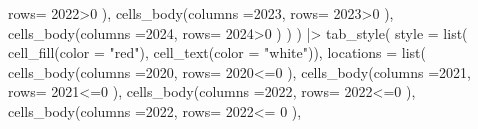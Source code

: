 \documentclass[
  letterpaper,
  DIV=11,
  numbers=noendperiod]{scrreprt}
\newenvironment{Shaded}{\begin{snugshade}}{\end{snugshade}}
\newcommand{\AttributeTok}[1]{\textcolor[rgb]{0.40,0.45,0.13}{#1}}
\newcommand{\DecValTok}[1]{\textcolor[rgb]{0.68,0.00,0.00}{#1}}
\newcommand{\FunctionTok}[1]{\textcolor[rgb]{0.28,0.35,0.67}{#1}}
\newcommand{\NormalTok}[1]{\textcolor[rgb]{0.00,0.23,0.31}{#1}}
\newcommand{\SpecialCharTok}[1]{\textcolor[rgb]{0.37,0.37,0.37}{#1}}
\newcommand{\StringTok}[1]{\textcolor[rgb]{0.13,0.47,0.30}{#1}}
\theoremstyle{definition}
\theoremstyle{remark}
\begin{document}
\begin{Shaded}
\begin{Highlighting}[]
                 \AttributeTok{rows=} \StringTok{\textasciigrave{}}\AttributeTok{2022}\StringTok{\textasciigrave{}}\SpecialCharTok{\textgreater{}}\DecValTok{0}\NormalTok{ ), }
       \FunctionTok{cells\_body}\NormalTok{(}\AttributeTok{columns =}\StringTok{\textasciigrave{}}\AttributeTok{2023}\StringTok{\textasciigrave{}}\NormalTok{, }
                 \AttributeTok{rows=} \StringTok{\textasciigrave{}}\AttributeTok{2023}\StringTok{\textasciigrave{}}\SpecialCharTok{\textgreater{}}\DecValTok{0}\NormalTok{ ), }
      \FunctionTok{cells\_body}\NormalTok{(}\AttributeTok{columns =}\StringTok{\textasciigrave{}}\AttributeTok{2024}\StringTok{\textasciigrave{}}\NormalTok{, }
                 \AttributeTok{rows=} \StringTok{\textasciigrave{}}\AttributeTok{2024}\StringTok{\textasciigrave{}}\SpecialCharTok{\textgreater{}}\DecValTok{0}\NormalTok{ )}
\NormalTok{    )}
\NormalTok{  ) }\SpecialCharTok{|\textgreater{}} 
  \FunctionTok{tab\_style}\NormalTok{(}
    \AttributeTok{style =} \FunctionTok{list}\NormalTok{(}
      \FunctionTok{cell\_fill}\NormalTok{(}\AttributeTok{color =} \StringTok{"red"}\NormalTok{), }
      \FunctionTok{cell\_text}\NormalTok{(}\AttributeTok{color =} \StringTok{"white"}\NormalTok{)), }
        \AttributeTok{locations =} \FunctionTok{list}\NormalTok{(}
      \FunctionTok{cells\_body}\NormalTok{(}\AttributeTok{columns =}\StringTok{\textasciigrave{}}\AttributeTok{2020}\StringTok{\textasciigrave{}}\NormalTok{, }
                 \AttributeTok{rows=} \StringTok{\textasciigrave{}}\AttributeTok{2020}\StringTok{\textasciigrave{}}\SpecialCharTok{\textless{}=}\DecValTok{0}\NormalTok{ ), }
      \FunctionTok{cells\_body}\NormalTok{(}\AttributeTok{columns =}\StringTok{\textasciigrave{}}\AttributeTok{2021}\StringTok{\textasciigrave{}}\NormalTok{, }
                 \AttributeTok{rows=} \StringTok{\textasciigrave{}}\AttributeTok{2021}\StringTok{\textasciigrave{}}\SpecialCharTok{\textless{}=}\DecValTok{0}\NormalTok{ ), }
       \FunctionTok{cells\_body}\NormalTok{(}\AttributeTok{columns =}\StringTok{\textasciigrave{}}\AttributeTok{2022}\StringTok{\textasciigrave{}}\NormalTok{, }
                 \AttributeTok{rows=} \StringTok{\textasciigrave{}}\AttributeTok{2022}\StringTok{\textasciigrave{}}\SpecialCharTok{\textless{}=}\DecValTok{0}\NormalTok{ ), }
       \FunctionTok{cells\_body}\NormalTok{(}\AttributeTok{columns =}\StringTok{\textasciigrave{}}\AttributeTok{2022}\StringTok{\textasciigrave{}}\NormalTok{, }
                 \AttributeTok{rows=} \StringTok{\textasciigrave{}}\AttributeTok{2022}\StringTok{\textasciigrave{}}\SpecialCharTok{\textless{}=} \DecValTok{0}\NormalTok{ ), }

\end{Highlighting}
\end{Shaded}
\end{document}
